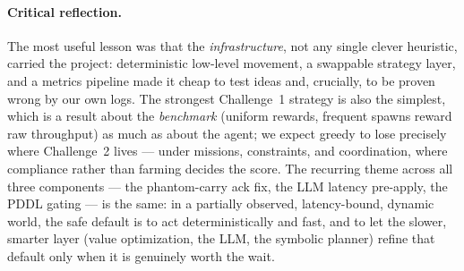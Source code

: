 \paragraph{Critical reflection.} The most useful lesson was that the
\emph{infrastructure}, not any single clever heuristic, carried the project:
deterministic low-level movement, a swappable strategy layer, and a metrics
pipeline made it cheap to test ideas and, crucially, to be proven wrong by our
own logs. The strongest Challenge~1 strategy is also the simplest, which is a
result about the \emph{benchmark} (uniform rewards, frequent spawns reward raw
throughput) as much as about the agent; we expect greedy to lose precisely where
Challenge~2 lives --- under missions, constraints, and coordination, where
compliance rather than farming decides the score. The recurring theme across all
three components --- the phantom-carry ack fix, the LLM latency pre-apply, the
PDDL gating --- is the same: in a partially observed, latency-bound, dynamic
world, the safe default is to act deterministically and fast, and to let the
slower, smarter layer (value optimization, the LLM, the symbolic planner) refine
that default only when it is genuinely worth the wait.

